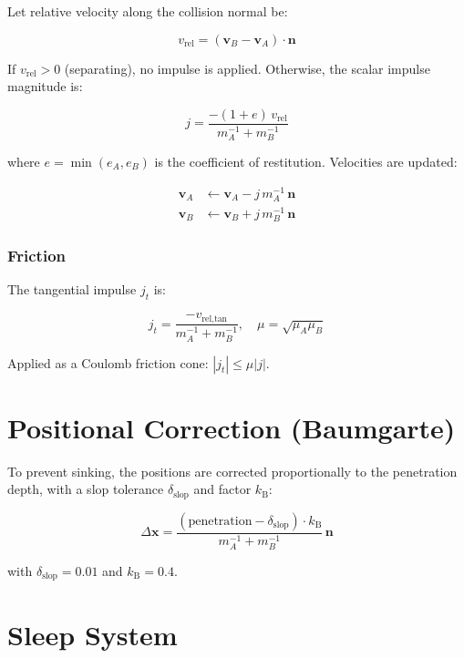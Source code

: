 Let relative velocity along the collision normal be:

\begin{equation}
v_\text{rel} = (\mathbf{v}_B - \mathbf{v}_A) \cdot \mathbf{n}
\end{equation}

If $v_\text{rel} > 0$ (separating), no impulse is applied.
Otherwise, the scalar impulse magnitude is:

\begin{equation}
j = \frac{-(1 + e)\, v_\text{rel}}{m_A^{-1} + m_B^{-1}}
\label{eq:impulse}
\end{equation}

where $e = \min(e_A, e_B)$ is the coefficient of restitution.
Velocities are updated:

\begin{align}
  \mathbf{v}_A &\leftarrow \mathbf{v}_A - j\,m_A^{-1}\,\mathbf{n} \\
  \mathbf{v}_B &\leftarrow \mathbf{v}_B + j\,m_B^{-1}\,\mathbf{n}
\end{align}

\subsubsection{Friction}

The tangential impulse $j_t$ is:

\begin{equation}
j_t = \frac{-v_\text{rel,tan}}{m_A^{-1} + m_B^{-1}},
\quad \mu = \sqrt{\mu_A \mu_B}
\end{equation}

Applied as a Coulomb friction cone: $|j_t| \leq \mu |j|$.

\section{Positional Correction (Baumgarte)}

To prevent sinking, the positions are corrected proportionally to the
penetration depth, with a slop tolerance $\delta_\text{slop}$ and
factor $k_\text{B}$:

\begin{equation}
\Delta\mathbf{x} = \frac{(\text{penetration} - \delta_\text{slop}) \cdot k_\text{B}}{m_A^{-1} + m_B^{-1}}\,\mathbf{n}
\end{equation}

with $\delta_\text{slop} = 0.01$ and $k_\text{B} = 0.4$.

\section{Sleep System}

